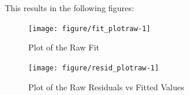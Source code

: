 \documentclass[english]{article}\usepackage[]{graphicx}\usepackage[]{color}
\newenvironment{knitrout}{}{} %
\begin{document}
This results in the following figures:
\begin{figure}[H]
	\caption{Plot of the Raw Fit}
	\begin{center}
\begin{knitrout}
\color{fgcolor}
\texttt{[image: figure/fit\_plotraw-1]} 

\end{knitrout}
\par\end{center}
\end{figure}
\begin{figure}[H]
	\caption{Plot of the Raw Residuals vs Fitted Values}
	\begin{center}
\begin{knitrout}
\color{fgcolor}
\texttt{[image: figure/resid\_plotraw-1]} 

\end{knitrout}
\par\end{center}
\end{figure}
\end{document}

